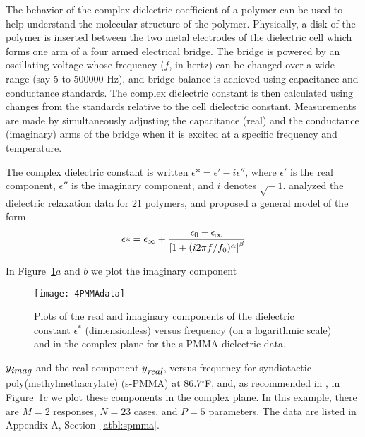 \begin{example}\label{spmma:1}
The behavior of the complex dielectric coefficient of a polymer
can be used to help understand the molecular structure of the
polymer.
Physically, a disk of the polymer is inserted between the two
metal electrodes of the dielectric cell which forms one arm of a
four armed electrical bridge.
The bridge is powered by an oscillating voltage whose frequency
($f$, in hertz) can be changed over a wide range (say 5 to 500000
Hz), and bridge balance is achieved using capacitance and
conductance standards.
The complex dielectric constant is then calculated using changes
from the standards relative to the cell dielectric constant.
Measurements are made by simultaneously adjusting the capacitance
(real) and the conductance (imaginary) arms of the bridge
when it is excited at a specific frequency and temperature.

The complex dielectric constant is written
$\epsilon * = \epsilon ' - i \epsilon ''$, where
$\epsilon '$ is the real component, $\epsilon ''$ is the
imaginary component, and $i$ denotes $\sqrt -1$.
analyzed the dielectric relaxation data for 21 polymers, and
proposed a general model of the form
  \begin{equation}\label{eqn:4.1}
    \epsilon *  =  \epsilon_{\infty} +
    {\epsilon_0-\epsilon_{\infty}\over\left[1+(i 2\pi f/f_0)^\alpha
    \right]^{\beta}}
  \end{equation}

In Figure~\ref{fig:PMMAdata}$a$ and $b$ we plot the imaginary component
  \begin{figure}
    \centerline{\texttt{[image: 4PMMAdata]}}%
    \caption{\label{fig:PMMAdata}
    Plots of the real and imaginary components of the dielectric constant
    $\epsilon^{*}$ (dimensionless)
    versus frequency (on a logarithmic scale) and in the complex
    plane for the s-PMMA dielectric data.
    }
  \end{figure}
$y_{\mbox{\it imag}}$ and the real component
$y_{\mbox{\it real}}$, versus frequency for syndiotactic
poly(methylmethacrylate) (s-PMMA) at 86.7$^\circ$F,
and, as recommended in ,
in Figure~\ref{fig:PMMAdata}$c$ we plot these components in the complex
plane.
In this example, there are $M = 2$ responses, $N = 23$ cases,
and $P = 5$ parameters.
The data are listed in Appendix A, Section~\ref{atbl:spmma}.
\end{example}

